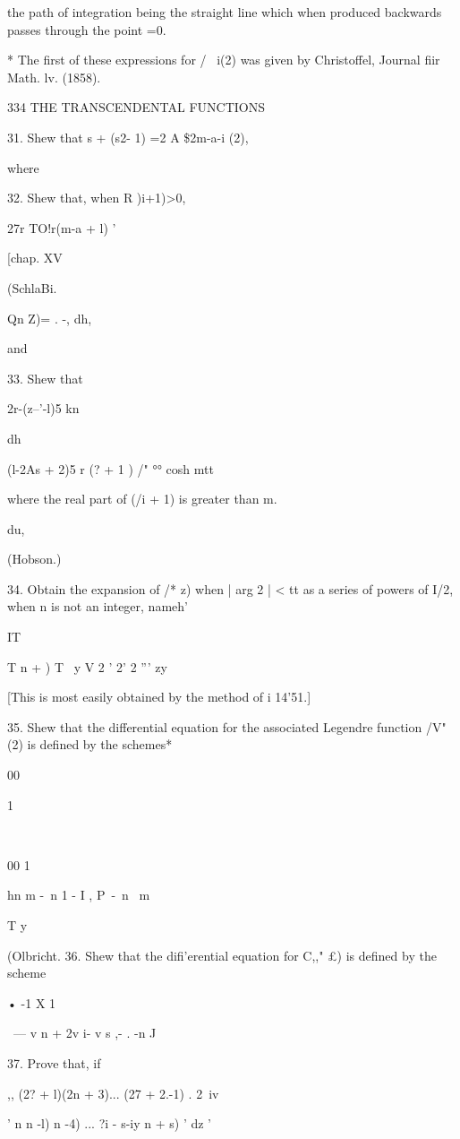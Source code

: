 {{{{the path of integration being the straight line which when produced
backwards passes through the point =0.

* The first of these expressions for / \ i(2) was given by
Christoffel, Journal fiir Math. lv. (1858).

334 THE TRANSCENDENTAL FUNCTIONS

31. Shew that s + (s2- 1) =2 A \$2m-a-i (2),

where

32. Shew that, when R )i+1)>0,

27r TO!r(m-a + l) '

[chap. XV

(SchlaBi.

Qn Z)= . -, dh,

and

33. Shew that


 2r-(z--'-l)5 kn

dh

(l-2As + 2)5 r (? + 1 ) /" °° cosh mtt

where the real part of (/i + 1) is greater than m.

du,

(Hobson.)

34. Obtain the expansion of /* z) when | arg 2 | < tt as a series of
powers of I/2, when n is not an integer, nameh'

IT

T n + ) T \ y V 2 ' 2' 2 ''' zy

[This is most easily obtained by the method of i 14'51.]

35. Shew that the differential equation for the associated Legendre
function /V" (2) is defined by the schemes*

00

1

\

00 1

hn m -\ n 1 - I , P\ -\ n \ m ~

T y

(Olbricht. 36. Shew that the difi'erential equation for C,," £) is
defined by the scheme

• -1 X 1 \

\ — v n + 2v i- v s ,- . -n J

37. Prove that, if

,, (2? + l)(2n + 3)... (27 + 2.-1) . 2\ iv

 ' n n -l) n -4) ... ?i - s-iy n + s) ' dz '

}}}}
